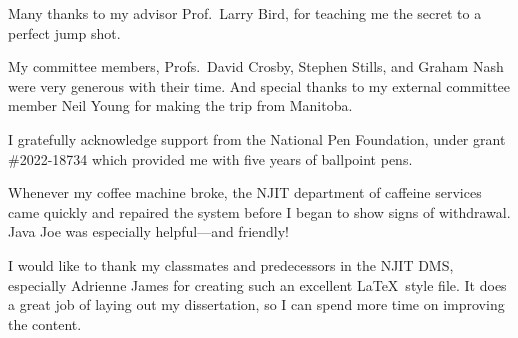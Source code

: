 Many thanks to my advisor Prof.\ Larry Bird, for teaching me the secret to a perfect jump shot.

My committee members, Profs.\ David Crosby, Stephen Stills, and Graham Nash were very generous with their time.  And special thanks to my external committee member Neil Young for making the trip from Manitoba.

\noindent
I gratefully acknowledge support from the National Pen Foundation, under grant \#2022-18734 which provided me with five years of ballpoint pens.

Whenever my coffee machine broke, the NJIT department of caffeine services came quickly and repaired the system before I began to show signs of withdrawal. Java Joe was especially helpful---and friendly!

I would like to thank my classmates and predecessors in the NJIT DMS, especially Adrienne James for creating such an excellent \LaTeX\ style file.  It
does a great job of laying out my dissertation, so I can spend more time on
improving the content.  